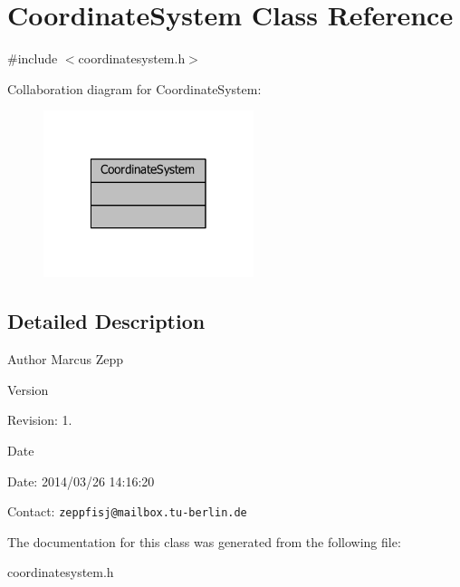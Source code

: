 \section{Coordinate\-System Class Reference}
\label{classCoordinateSystem}


{\ttfamily \#include $<$coordinatesystem.\-h$>$}



Collaboration diagram for Coordinate\-System\-:
\nopagebreak
\begin{figure}[H]
\begin{center}
\leavevmode
\includegraphics[width=174pt]{d7/d07/classCoordinateSystem__coll__graph}
\end{center}
\end{figure}


\subsection{Detailed Description}
\begin{DoxyAuthor}{Author}
Marcus Zepp
\end{DoxyAuthor}
\begin{DoxyVersion}{Version}

\end{DoxyVersion}
\begin{DoxyParagraph}{Revision\-:}
1. 
\end{DoxyParagraph}


\begin{DoxyDate}{Date}

\end{DoxyDate}
\begin{DoxyParagraph}{Date\-:}
2014/03/26 14\-:16\-:20 
\end{DoxyParagraph}


Contact\-: {\tt zeppfisj@mailbox.\-tu-\/berlin.\-de} 

The documentation for this class was generated from the following file\-:\begin{DoxyCompactItemize}
\item 
coordinatesystem.\-h\end{DoxyCompactItemize}
